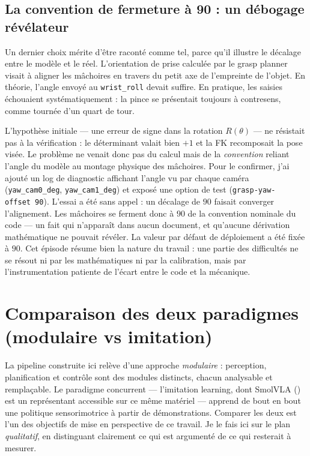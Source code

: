 \subsection{La convention de fermeture à 90\textdegree{} : un débogage révélateur}

Un dernier choix mérite d'être raconté comme tel, parce qu'il illustre le décalage
entre le modèle et le réel. L'orientation de prise calculée par le grasp planner
visait à aligner les mâchoires en travers du petit axe de l'empreinte de l'objet.
En théorie, l'angle envoyé au \texttt{wrist\_roll} devait suffire. En pratique, les
saisies échouaient systématiquement : la pince se présentait toujours à
contresens, comme tournée d'un quart de tour.

L'hypothèse initiale --- une erreur de signe dans la rotation $R(\theta)$ --- ne
résistait pas à la vérification : le déterminant valait bien $+1$ et la FK
recomposait la pose visée. Le problème ne venait donc pas du calcul mais de la
\emph{convention} reliant l'angle du modèle au montage physique des mâchoires. Pour
le confirmer, j'ai ajouté un log de diagnostic affichant l'angle vu par chaque
caméra (\texttt{yaw\_cam0\_deg}, \texttt{yaw\_cam1\_deg}) et exposé une option de
test (\texttt{grasp-yaw-offset~90}). L'essai a été sans appel : un décalage de
$90$\textdegree{} faisait converger l'alignement. Les mâchoires se ferment donc à
$90$\textdegree{} de la convention nominale du code --- un fait qui n'apparaît dans
aucun document, et qu'aucune dérivation mathématique ne pouvait révéler. La valeur
par défaut de déploiement a été fixée à $90$\textdegree{}. Cet épisode résume bien
la nature du travail : une partie des difficultés ne se résout ni par les
mathématiques ni par la calibration, mais par l'instrumentation patiente de
l'écart entre le code et la mécanique.

\section{Comparaison des deux paradigmes (modulaire vs imitation)}
\label{sec:disc_paradigmes}

La pipeline construite ici relève d'une approche \emph{modulaire} : perception,
planification et contrôle sont des modules distincts, chacun analysable et
remplaçable. Le paradigme concurrent --- l'imitation learning, dont SmolVLA
(\cite{shukor_smolvla_2025}) est un représentant accessible sur ce même matériel
--- apprend de bout en bout une politique sensorimotrice à partir de
démonstrations. Comparer les deux est l'un des objectifs de mise en perspective de
ce travail. Je le fais ici sur le plan \emph{qualitatif}, en distinguant clairement
ce qui est argumenté de ce qui resterait à mesurer.

